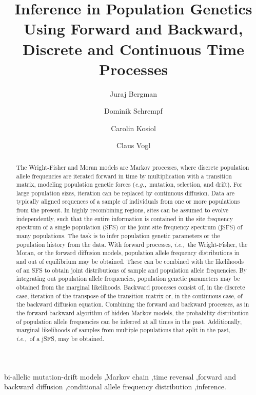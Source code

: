 \documentclass[preprint]{elsarticle}
\newcommand\eg{{\it e.g.,}}
\newcommand\ie{{\it i.e.,}}
\begin{document}
\begin{frontmatter}

\title{Inference in Population Genetics Using Forward and Backward, Discrete and Continuous Time Processes}

\author[address1,address2]{Juraj Bergman}
\author[address1,address2]{Dominik Schrempf}
\author[address1]{Carolin Kosiol}
\author[address3]{Claus Vogl}

\address[address1]{Institut f\"ur Populationsgenetik, Vetmeduni Vienna, Veterin\"arplatz 1, A-1210 Wien, Austria}
\address[address2]{Vienna Graduate School of Population Genetics, A-1210 Wien, Austria}
\address[address3]{Institut f\"ur Tierzucht und Genetik, Vetmeduni Vienna, Veterin\"arplatz 1, A-1210 Wien, Austria}

\begin{abstract}
The Wright-Fisher and Moran models are Markov processes, where discrete population allele frequencies are iterated forward in time by multiplication with a transition matrix, modeling population genetic forces (\eg\ mutation, selection, and drift). For large population sizes, iteration can be replaced by continuous diffusion. Data are typically aligned sequences of a sample of individuals from one or more populations from the present. In highly recombining regions, sites can be assumed to evolve independently, such that the entire information is contained in the site frequency spectrum of a single population (SFS) or the joint site frequency spectrum (jSFS) of many populations. The task is to infer population genetic parameters or the population history from the data. With forward processes, \ie\ the Wright-Fisher, the Moran, or the forward diffusion models, population allele frequency distributions in and out of equilibrium may be obtained. These can be combined with the likelihoods of an SFS to obtain joint distributions of sample and population allele frequencies. By integrating out population allele frequencies, population genetic parameters may be obtained from the marginal likelihoods. Backward processes consist of, in the discrete case, iteration of the transpose of the transition matrix or, in the continuous case, of the backward diffusion equation. Combining the forward and backward processes, as in the forward-backward algorithm of hidden Markov models, the probability distribution of population allele frequencies can be inferred at all times in the past. Additionally, marginal likelihoods of samples from multiple populations that split in the past, \ie\ of a jSFS, may be obtained.
\end{abstract}
\begin{keyword}
bi-allelic mutation-drift models \sep Markov chain \sep time reversal \sep forward and backward diffusion \sep conditional allele frequency distribution \sep inference.
\end{keyword}

\end{frontmatter}
\end{document}
